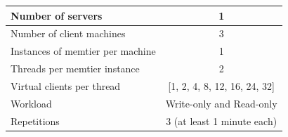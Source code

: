 \documentclass[report.tex]{subfiles}
\begin{document}
\begin{center}
	\scriptsize{
		\begin{tabular}{|l|c|}
			\hline Number of servers                & 1                        \\ 
			\hline Number of client machines        & 3                        \\ 
			\hline Instances of memtier per machine & 1                        \\ 
			\hline Threads per memtier instance     & 2                        \\
			\hline Virtual clients per thread       & [1, 2, 4, 8, 12, 16, 24, 32]\\ 
			\hline Workload                         & Write-only and Read-only \\
			\hline Repetitions                      & 3 (at least 1 minute each)\\ 
			\hline 
		\end{tabular}
	}
\end{center}
\end{document}
